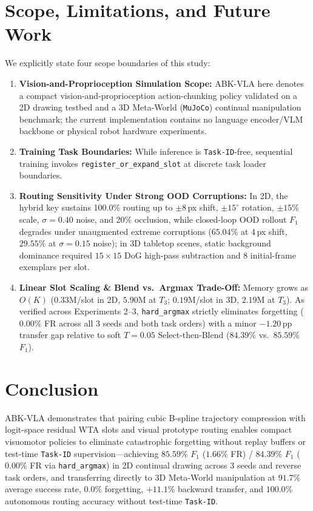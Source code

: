 \documentclass[10pt,twocolumn]{article}
\begin{document}
\section{Scope, Limitations, and Future Work}
We explicitly state four scope boundaries of this study:
\begin{enumerate}
    \item \textbf{Vision-and-Proprioception Simulation Scope:} ABK-VLA here denotes a compact vision-and-proprioception action-chunking policy validated on a 2D drawing testbed and a 3D Meta-World (\texttt{MuJoCo}) continual manipulation benchmark; the current implementation contains no language encoder/VLM backbone or physical robot hardware experiments.
    \item \textbf{Training Task Boundaries:} While inference is \texttt{Task-ID}-free, sequential training invokes \texttt{register\_or\_expand\_slot} at discrete task loader boundaries.
    \item \textbf{Routing Sensitivity Under Strong OOD Corruptions:} In 2D, the hybrid key sustains 100.0\% routing up to $\pm 8$\,px shift, $\pm 15^\circ$ rotation, $\pm 15\%$ scale, $\sigma=0.40$ noise, and 20\% occlusion, while closed-loop OOD rollout $F_1$ degrades under unaugmented extreme corruptions ($65.04\%$ at 4\,px shift, $29.55\%$ at $\sigma=0.15$ noise); in 3D tabletop scenes, static background dominance required $15\times 15$ DoG high-pass subtraction and 8 initial-frame exemplars per slot.
    \item \textbf{Linear Slot Scaling \& Blend vs.\ Argmax Trade-Off:} Memory grows as $O(K)$ ($0.33\text{M}$/slot in 2D, $5.90\text{M}$ at $T_3$; $0.19\text{M}$/slot in 3D, $2.19\text{M}$ at $T_3$). As verified across Experiments 2--3, \texttt{hard\_argmax} strictly eliminates forgetting ($0.00\%$ FR across all 3 seeds and both task orders) with a minor $-1.20$\,pp transfer gap relative to soft $T=0.05$ Select-then-Blend ($84.39\%$ vs.\ $85.59\%$ $F_1$).
\end{enumerate}

\section{Conclusion}
ABK-VLA demonstrates that pairing cubic B-spline trajectory compression with logit-space residual WTA slots and visual prototype routing enables compact visuomotor policies to eliminate catastrophic forgetting without replay buffers or test-time \texttt{Task-ID} supervision---achieving $85.59\%$ $F_1$ ($1.66\%$ FR) / $84.39\%$ $F_1$ ($0.00\%$ FR via \texttt{hard\_argmax}) in 2D continual drawing across 3 seeds and reverse task orders, and transferring directly to 3D Meta-World manipulation at $91.7\%$ average success rate, $0.0\%$ forgetting, $+11.1\%$ backward transfer, and $100.0\%$ autonomous routing accuracy without test-time \texttt{Task-ID}.
\end{document}
